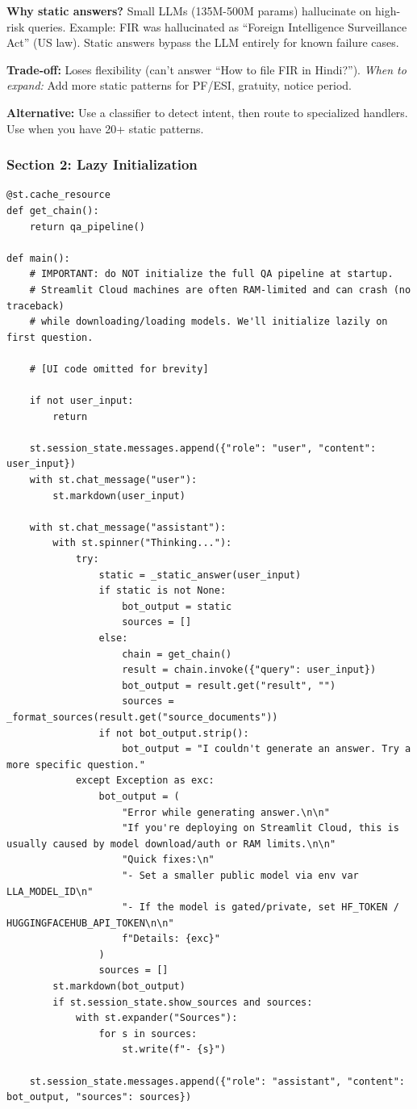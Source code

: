 \documentclass[11pt,a4paper]{article}
\begin{document}
\textbf{Why static answers?} Small LLMs (135M-500M params) hallucinate on high-risk queries. Example: FIR was hallucinated as ``Foreign Intelligence Surveillance Act'' (US law). Static answers bypass the LLM entirely for known failure cases.

\textbf{Trade-off:} Loses flexibility (can't answer ``How to file FIR in Hindi?''). \textit{When to expand:} Add more static patterns for PF/ESI, gratuity, notice period.

\textbf{Alternative:} Use a classifier to detect intent, then route to specialized handlers. Use when you have 20+ static patterns.

\subsubsection{Section 2: Lazy Initialization}

\begin{lstlisting}
@st.cache_resource
def get_chain():
    return qa_pipeline()

def main():
    # IMPORTANT: do NOT initialize the full QA pipeline at startup.
    # Streamlit Cloud machines are often RAM-limited and can crash (no traceback)
    # while downloading/loading models. We'll initialize lazily on first question.

    # [UI code omitted for brevity]

    if not user_input:
        return

    st.session_state.messages.append({"role": "user", "content": user_input})
    with st.chat_message("user"):
        st.markdown(user_input)

    with st.chat_message("assistant"):
        with st.spinner("Thinking..."):
            try:
                static = _static_answer(user_input)
                if static is not None:
                    bot_output = static
                    sources = []
                else:
                    chain = get_chain()
                    result = chain.invoke({"query": user_input})
                    bot_output = result.get("result", "")
                    sources = _format_sources(result.get("source_documents"))
                if not bot_output.strip():
                    bot_output = "I couldn't generate an answer. Try a more specific question."
            except Exception as exc:
                bot_output = (
                    "Error while generating answer.\n\n"
                    "If you're deploying on Streamlit Cloud, this is usually caused by model download/auth or RAM limits.\n\n"
                    "Quick fixes:\n"
                    "- Set a smaller public model via env var LLA_MODEL_ID\n"
                    "- If the model is gated/private, set HF_TOKEN / HUGGINGFACEHUB_API_TOKEN\n\n"
                    f"Details: {exc}"
                )
                sources = []
        st.markdown(bot_output)
        if st.session_state.show_sources and sources:
            with st.expander("Sources"):
                for s in sources:
                    st.write(f"- {s}")

    st.session_state.messages.append({"role": "assistant", "content": bot_output, "sources": sources})
\end{lstlisting}
\end{document}
